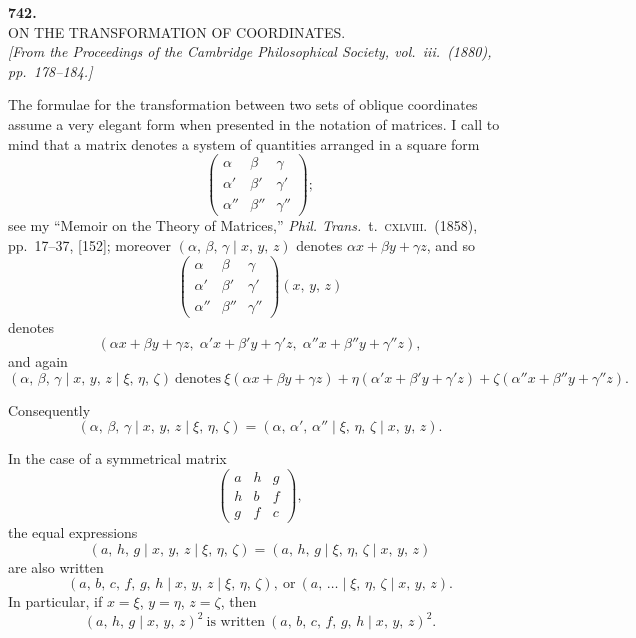 \documentclass[11pt]{article}
\begin{document}
\bigskip

\begin{center}
\textbf{742.}\\[6pt]
\textsc{ON THE TRANSFORMATION OF COORDINATES.}\\[6pt]
\textit{[From the Proceedings of the Cambridge Philosophical Society, vol.\ iii.\ (1880),\\
pp.\ 178--184.]}
\end{center}

\bigskip

The formulae for the transformation between two sets of oblique coordinates assume
a very elegant form when presented in the notation of matrices. I call to mind that a
matrix denotes a system of quantities arranged in a square form
\[
   \begin{pmatrix} \alpha   & \beta   & \gamma   \\
                   \alpha'  & \beta'  & \gamma'  \\
                   \alpha'' & \beta'' & \gamma'' \end{pmatrix};
\]
see my ``Memoir on the Theory of Matrices,'' \textit{Phil. Trans.}\ t.\ \textsc{cxlviii}.\ (1858),
pp.\ 17--37, [152]; moreover $(\alpha,\, \beta,\, \gamma \mid x,\, y,\, z)$ denotes $\alpha x + \beta y + \gamma z$, and so
\[
   \begin{pmatrix} \alpha   & \beta   & \gamma   \\
                   \alpha'  & \beta'  & \gamma'  \\
                   \alpha'' & \beta'' & \gamma'' \end{pmatrix}\!(x,\, y,\, z)
\]
denotes
\[
   (\alpha x + \beta y + \gamma z,\; \alpha' x + \beta' y + \gamma' z,\; \alpha'' x + \beta'' y + \gamma'' z),
\]
and again
\[
   (\alpha,\, \beta,\, \gamma \mid x,\, y,\, z \mid \xi,\, \eta,\, \zeta)\ \text{denotes}\
   \xi(\alpha x + \beta y + \gamma z) + \eta(\alpha' x + \beta' y + \gamma' z) + \zeta(\alpha'' x + \beta'' y + \gamma'' z).
\]

Consequently
\[
   (\alpha,\, \beta,\, \gamma \mid x,\, y,\, z \mid \xi,\, \eta,\, \zeta)
   = (\alpha,\, \alpha',\, \alpha'' \mid \xi,\, \eta,\, \zeta \mid x,\, y,\, z).
\]

\medskip

In the case of a symmetrical matrix
\[
   \begin{pmatrix} a & h & g \\ h & b & f \\ g & f & c \end{pmatrix},
\]
the equal expressions
\[
   (a,\, h,\, g \mid x,\, y,\, z \mid \xi,\, \eta,\, \zeta) = (a,\, h,\, g \mid \xi,\, \eta,\, \zeta \mid x,\, y,\, z)
\]
are also written
\[
   (a,\, b,\, c,\, f,\, g,\, h \mid x,\, y,\, z \mid \xi,\, \eta,\, \zeta),\ \text{or}\ (a,\,\ldots \mid \xi,\, \eta,\, \zeta \mid x,\, y,\, z).
\]
In particular, if $x = \xi$, $y = \eta$, $z = \zeta$, then
\[
   (a,\, h,\, g \mid x,\, y,\, z)^2\ \text{is written}\ (a,\, b,\, c,\, f,\, g,\, h \mid x,\, y,\, z)^2.
\]
\end{document}
